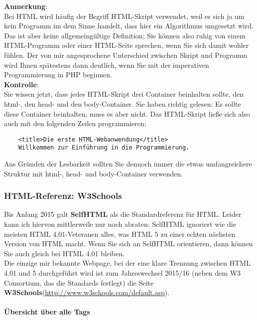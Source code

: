 \textbf{Anmerkung}:\\

Bei HTML wird häufig der Begriff HTML-Skript verwendet, weil es sich ja um kein Programm im dem Sinne handelt, dass hier ein Algorithmus umgesetzt wird. Das ist aber keine allgemeingültige Definition; Sie können also ruhig von einem HTML-Programm oder einer HTML-Seite sprechen, wenn Sie sich damit wohler fühlen. Der von mir angesprochene Unterschied zwischen Skript und Programm wird Ihnen spätestens dann deutlich, wenn Sie mit der imperativen Programmierung in PHP beginnen.\\

\textbf{Kontrolle}:\\

Sie wissen jetzt, dass jedes HTML-Skript drei Container beinhalten sollte, den html-, den head- und den body-Container. Sie haben richtig gelesen: Es sollte diese Container beinhalten, muss es aber nicht. Das HTML-Skript ließe sich also auch mit den folgenden Zeilen programmieren:\\

\begin{verbatim}
	<title>Die erste HTML-Webanwendung</title>
	Willkommen zur Einführung in die Programmierung.
\end{verbatim}

Aus Gründen der Lesbarkeit sollten Sie dennoch immer die etwas umfangreichere Struktur mit html-, head- und body-Container verwenden.

\subsubsection{HTML-Referenz: W3Schools}

Bis Anfang 2015 galt \textbf{SelfHTML} als die Standardreferenz für HTML. Leider kann ich hiervon mittlerweile nur noch abraten: SelfHTML ignoriert wie die meisten HTML 4.01-Veteranen alles, was HTML 5 zu einer echten nächsten Version von HTML macht. Wenn Sie sich an SelfHTML orientieren, dann können Sie auch gleich bei HTML 4.01 bleiben.\\

Die einzige mir bekannte Webpage, bei der eine klare Trennung zwischen HTML 4.01 und 5 durchgeführt wird ist zum Jahreswechsel 2015/16 (neben dem W3 Consortium, das die Standards festlegt) die Seite \textbf{W3Schools}(\url{http://www.w3schools.com/default.asp}).

\paragraph{Übersicht über alle Tags}

